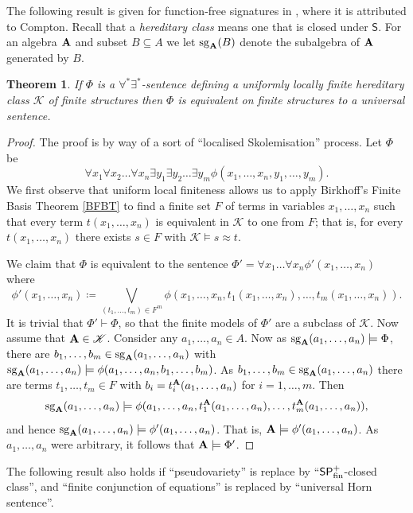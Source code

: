 \documentclass[10pt,a4paper]{amsart}
\theoremstyle{plain}
\newtheorem{thm}{Theorem}[section]
\theoremstyle{definition}
\newcommand{\sg}[2]{\mathrm{sg}_{#1}(#2)}
\begin{document}
The following result is given for function-free signatures in \cite[Theorem 3]{gur2}, where it is attributed to Compton.  Recall that a \emph{hereditary class} means one that is closed under $\mathsf{S}$.  For an algebra ${\bf A}$ and subset $B\subseteq A$ we let $\sg{\bf A}{B}$ denote the subalgebra of ${\bf A}$ generated by $B$.
\begin{thm}\label{thm:forallexists}
If $\Phi$ is a $\forall^*\exists^*$-sentence defining a uniformly locally finite hereditary class $\mathscr{K}$ of finite structures 
then $\Phi$ is equivalent on finite structures to a universal sentence.
\end{thm}
\begin{proof}
The proof is by way of a sort of ``localised Skolemisation'' process.  Let $\Phi$ be 
\[
\forall x_1\forall x_2\dots\forall x_n\exists y_1\exists y_2\dots \exists y_m \phi(x_1,\dots,x_n,y_1,\dots,y_m).
\]
We first observe that uniform local finiteness allows us to apply Birkhoff's Finite Basis Theorem \ref{BFBT} to find a finite set $F$ of terms in variables $x_1,\dots,x_n$ such that every term $t(x_1,\dots,x_n)$ is equivalent in $\mathscr{K}$ to one from $F$; that is, for every $t(x_1,\dots,x_n)$ there exists $s\in F$ with $\mathscr{K}\models s\approx t$.  

We claim that $\Phi$ is equivalent to the  sentence $\Phi'=\forall x_1\dots\forall x_n\phi'(x_1,\dots,x_n)$ where
\[
\phi'(x_1,\dots,x_n)\coloneqq  \bigvee_{(t_1,\dots,t_m)\in F^m}\phi(x_1,\dots,x_n,t_1(x_1,\dots,x_n),\dots,t_m(x_1,\dots,x_n)).
\]
It is trivial that $\Phi'\vdash \Phi$, so that the finite models of $\Phi'$ are a subclass of $\mathscr{K}$.  Now assume that ${\bf A}\in\mathscr{K}$.  Consider any $a_1,\dots,a_n\in A$.  Now as $\sg{{\bf A}}{a_1,\dots,a_n}\models \Phi$, there are $b_1,\dots,b_m\in \sg{{\bf A}}{a_1,\dots,a_n}$ with $\sg{{\bf A}}{a_1,\dots,a_n}\models \phi(a_1,\dots,a_n,b_1,\dots,b_m)$.  As $b_1,\dots,b_m\in \sg{{\bf A}}{a_1,\dots,a_n}$ there are terms $t_1,\dots,t_m\in F$ with $b_i=t_i^{\bf A}(a_1,\dots,a_n)$ for $i=1,\dots,m$.  Then 
\[
\sg{{\bf A}}{a_1,\dots,a_n}\models \phi(a_1,\dots,a_n,t_1^{\bf A}(a_1,\dots,a_n),\dots,t_m^{\bf A}(a_1,\dots,a_n)),
\]
and hence $\sg{{\bf A}}{a_1,\dots,a_n}\models\phi'(a_1,\dots,a_n)$.  That is, ${\bf A}\models \phi'(a_1,\dots,a_n)$.  As $a_1,\dots,a_n$ were arbitrary, it follows that ${\bf A}\models \Phi'$.
\end{proof}
The following result also holds if ``pseudovariety'' is replace by ``$\mathsf{SP}_{\rm fin}^+$-closed class'', and ``finite conjunction of equations'' is replaced by ``universal Horn sentence''.
\end{document}
